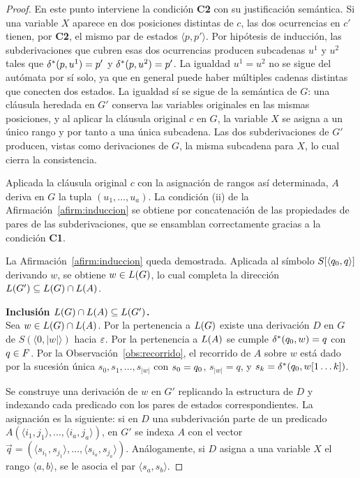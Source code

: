 \begin{proof}
En este punto interviene la condición \textbf{C2} con su justificación semántica. Si una variable $X$ aparece en dos posiciones distintas de $c$, las dos ocurrencias en $c'$ tienen, por \textbf{C2}, el mismo par de estados $\langle p, p' \rangle$. Por hipótesis de inducción, las subderivaciones que cubren esas dos ocurrencias producen subcadenas $u^1$ y $u^2$ tales que $\delta^{*}(p, u^1) = p'$ y $\delta^{*}(p, u^2) = p'$. La igualdad $u^1 = u^2$ no se sigue del autómata por sí solo, ya que en general puede haber múltiples cadenas distintas que conecten dos estados. La igualdad sí se sigue de la semántica de $G$: una cláusula heredada en $G'$ conserva las variables originales en las mismas posiciones, y al aplicar la cláusula original $c$ en $G$, la variable $X$ se asigna a un único rango y por tanto a una única subcadena. Las dos subderivaciones de $G'$ producen, vistas como derivaciones de $G$, la misma subcadena para $X$, lo cual cierra la consistencia.

Aplicada la cláusula original $c$ con la asignación de rangos así determinada, $A$ deriva en $G$ la tupla $(u_1, \dots, u_a)$. La condición (ii) de la Afirmación~\ref{afirm:induccion} se obtiene por concatenación de las propiedades de pares de las subderivaciones, que se ensamblan correctamente gracias a la condición \textbf{C1}.

La Afirmación~\ref{afirm:induccion} queda demostrada. Aplicada al símbolo $S[\langle q_0, q \rangle]$ derivando $w$, se obtiene $w \in L(G)$, lo cual completa la dirección $L(G') \subseteq L(G) \cap L(A)$.

\medskip
\noindent\textbf{Inclusión $L(G) \cap L(A) \subseteq L(G')$.}\\
Sea $w \in L(G) \cap L(A)$. Por la pertenencia a $L(G)$ existe una derivación $D$ en $G$ de $S(\langle 0, \lvert w \rvert \rangle)$ hacia $\varepsilon$. Por la pertenencia a $L(A)$ se cumple $\delta^{*}(q_0, w) = q$ con $q \in F$. Por la Observación~\ref{obs:recorrido}, el recorrido de $A$ sobre $w$ está dado por la sucesión única $s_0, s_1, \dots, s_{\lvert w \rvert}$ con $s_0 = q_0$, $s_{\lvert w \rvert} = q$, y $s_k = \delta^{*}(q_0, w[1 \ldots k])$.

Se construye una derivación de $w$ en $G'$ replicando la estructura de $D$ y indexando cada predicado con los pares de estados correspondientes. La asignación es la siguiente: si en $D$ una subderivación parte de un predicado $A(\langle i_1, j_1 \rangle, \dots, \langle i_a, j_a \rangle)$, en $G'$ se indexa $A$ con el vector $\vec{q} = (\langle s_{i_1}, s_{j_1} \rangle, \dots, \langle s_{i_a}, s_{j_a} \rangle)$. Análogamente, si $D$ asigna a una variable $X$ el rango $\langle a, b \rangle$, se le asocia el par $\langle s_a, s_b \rangle$.


\end{proof}
